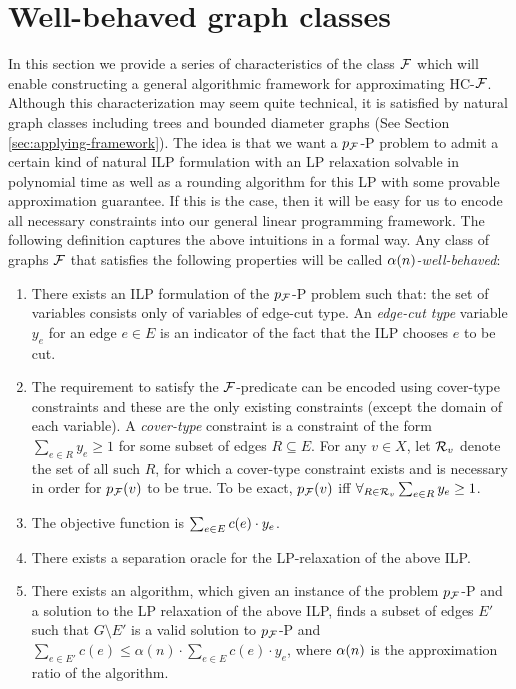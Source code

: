 \section{Well-behaved graph classes}

In this section we provide a series of characteristics of the class $\mathcal{F}$ which will enable constructing a general algorithmic framework for approximating \textsc{HC-$\mathcal{F}$}. Although this characterization may seem quite technical, it is satisfied by natural graph classes including trees and bounded diameter graphs (See Section \ref{sec:applying-framework}). The idea is that we want a \textsc{$p_{\mathcal{F}}$-P} problem to admit a certain kind of natural ILP formulation with an LP relaxation solvable in polynomial time as well as a rounding algorithm for this LP with some provable approximation guarantee. If this is the case, then it will be easy for us to encode all necessary constraints into our general linear programming framework. The following definition captures the above intuitions in a formal way.
Any class of graphs $\mathcal{F}$ that satisfies the following properties will be called \emph{$\alpha\mathopen{}\left( n \right)$-well-behaved}:
\begin{enumerate}
    \item There exists an ILP formulation of the \textsc{$p_{\mathcal{F}}$-P} problem such that: the set of variables consists only of variables of edge-cut type. An \emph{edge-cut type} variable $y_e$ for an edge $e\in E$ is an indicator of the fact that the ILP chooses $e$ to be cut. 
    \item The requirement to satisfy the $\mathcal{F}$-predicate can be encoded using cover-type constraints and these are the only existing constraints (except the domain of each variable). A \emph{cover-type} constraint is a constraint of the form $\sum_{e\in R} y_e \geq 1$ for some subset of edges $R\subseteq E$. For any $v\in X$, let $\mathcal{R}_v$ denote the set of all such $R$, for which a cover-type constraint exists and is necessary in order for $p_{\mathcal{F}}\mathopen{}\left( v \right)$ to be true. To be exact, $p_{\mathcal{F}}\mathopen{}\left( v \right)$ iff $\forall_{R\in \mathcal{R}_v} \sum_{e\in R} y_e \geq 1$.
    \item The objective function is $\sum_{e\in E} c\mathopen{}\left( e \right)\cdot y_e$.
    \item There exists a separation oracle for the LP-relaxation of the above ILP.
    \item There exists an algorithm, which given an instance of the problem \textsc{$p_{\mathcal{F}}$-P} and a solution to the LP relaxation of the above ILP, finds a subset of edges $E'$ such that $G\setminus E'$ is a valid solution to \textsc{$p_{\mathcal{F}}$-P} and $\sum_{e\in E'} c(e) \leq \alpha(n)\cdot \sum_{e\in E} c(e) \cdot y_e$, where $\alpha\mathopen{}\left( n \right)$ is the approximation ratio of the algorithm.
\end{enumerate}

